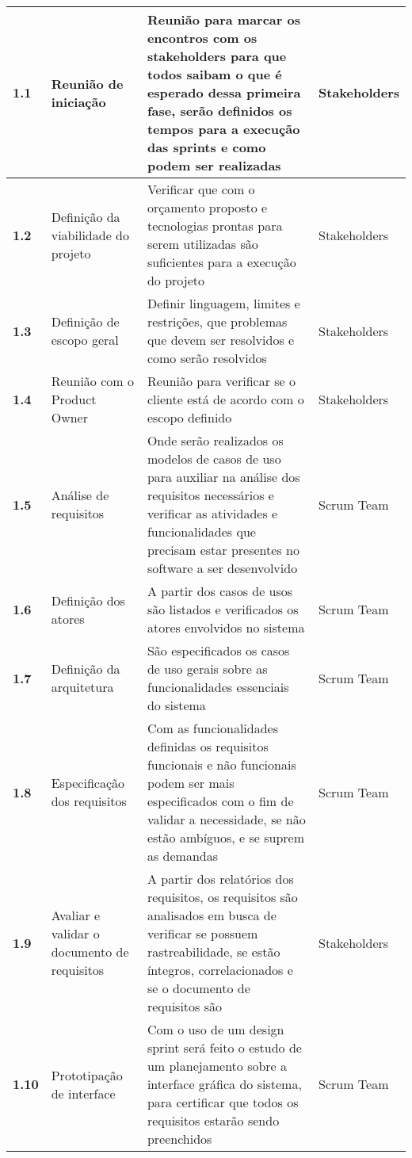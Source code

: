 \begin{longtable}[c]{|p{1.89em}|p{13.555em}|p{17.61em}|p{6.22em}|}
    \textbf{1.1} & Reunião de iniciação & Reunião para marcar os encontros com os stakeholders para que todos saibam o que é esperado dessa primeira fase, serão definidos os tempos para a execução das sprints e como podem ser realizadas & Stakeholders \\
    \midrule
    \textbf{1.2} & Definição da viabilidade do projeto & Verificar que com o orçamento proposto e tecnologias prontas para serem utilizadas são suficientes para a execução do projeto & Stakeholders \\
    \midrule
    \textbf{1.3} & Definição de escopo geral & Definir linguagem, limites e restrições, que problemas que devem ser resolvidos e como serão resolvidos & Stakeholders \\
    \midrule
    \textbf{1.4} & Reunião com o Product Owner & Reunião para verificar se o cliente está de acordo com o escopo definido & Stakeholders \\
    \midrule
    \textbf{1.5} & Análise de requisitos & Onde serão realizados os modelos de casos de uso para auxiliar na análise dos requisitos necessários e verificar as atividades e funcionalidades que precisam estar presentes no software a ser desenvolvido & Scrum Team \\
    \midrule
    \textbf{1.6} & Definição dos atores & A partir dos casos de usos são listados e verificados os atores envolvidos no sistema & Scrum Team \\
    \midrule
    \textbf{1.7} & Definição da arquitetura & São especificados os casos de uso gerais sobre as funcionalidades essenciais do sistema & Scrum Team \\
    \midrule
    \textbf{1.8} & Especificação dos requisitos & Com as funcionalidades definidas os requisitos funcionais e não funcionais podem ser mais especificados com o fim de validar a necessidade, se não estão ambíguos, e se suprem as demandas & Scrum Team \\
    \midrule
    \textbf{1.9} & Avaliar e validar o documento de requisitos & A partir dos relatórios dos requisitos, os requisitos são analisados em busca de verificar se possuem rastreabilidade, se estão íntegros, correlacionados e se o documento de requisitos são & Stakeholders \\
    \midrule
    \textbf{1.10} & Prototipação de interface & Com o uso de um design sprint será feito o estudo de um planejamento sobre a interface gráfica do sistema, para certificar que todos os requisitos estarão sendo preenchidos & Scrum Team \\

\end{longtable}
